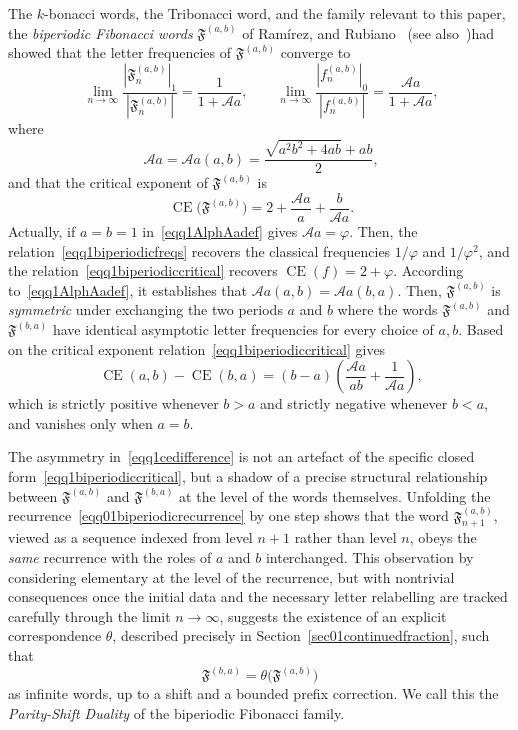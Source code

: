 \documentclass[12pt]{amsart}
\theoremstyle{plain}
\theoremstyle{definition}
\theoremstyle{remark}
\newcommand{\fphi}{\varphi}
\newcommand{\CE}{\operatorname{CE}}
\newcommand{\AlphA}{\mathcal{A}}
\newcommand{\FD}{\mathfrak{F}}
\begin{document}
The $k$-bonacci words, the Tribonacci
word, and the family relevant to this paper, the \emph{biperiodic
Fibonacci words} $\FD^{(a,b)}$ of Ram\'irez, and Rubiano~\cite{Ramirez2015} (see also~\cite{EdsonYayenie2009, MignosiPirillo1992})had showed that the letter frequencies of
$\FD^{(a,b)}$ converge to
\begin{equation}~\label{eqq1biperiodicfreqs}
  \lim_{n\to\infty}\frac{|\FD^{(a,b)}_n|_1}{|\FD^{(a,b)}_n|} = \frac{1}{1+\AlphA a},
  \qquad
  \lim_{n\to\infty}\frac{|f^{(a,b)}_n|_0}{|f^{(a,b)}_n|} = \frac{\AlphA a}{1+\AlphA a},
\end{equation}
where
\begin{equation}~\label{eqq1AlphAadef}
  \AlphA a = \AlphA a(a,b) = \frac{\sqrt{a^2b^2+4ab}+ab}{2},
\end{equation}
and that the critical exponent of $\FD^{(a,b)}$ is
\begin{equation}~\label{eqq1biperiodiccritical}
  \CE\bigl(\FD^{(a,b)}\bigr) = 2+\frac{\AlphA a}{a}+\frac{b}{\AlphA a}.
\end{equation}
Actually, if $a=b=1$ in~\eqref{eqq1AlphAadef} gives $\AlphA a=\fphi$. Then, the relation~\eqref{eqq1biperiodicfreqs} recovers the classical frequencies
$1/\fphi$ and $1/\fphi^2$, and the relation~\eqref{eqq1biperiodiccritical} recovers
$\CE(f)=2+\fphi$.  
According to~\eqref{eqq1AlphAadef}, it establishes that
$\AlphA a(a,b)=\AlphA a(b,a)$. Then,  $\FD^{(a,b)}$ is \emph{symmetric} under exchanging
the two periods $a$ and $b$ where the words $\FD^{(a,b)}$ and $\FD^{(b,a)}$ have
identical asymptotic letter frequencies for every choice of $a,b$. 
Based on the critical exponent relation~\eqref{eqq1biperiodiccritical} gives
\begin{equation}~\label{eqq1cedifference}
  \CE(a,b) - \CE(b,a)
  = (b-a)\left(\frac{\AlphA a}{ab} + \frac{1}{\AlphA a}\right),
\end{equation}
which is strictly positive whenever $b>a$ and strictly negative whenever
$b<a$, and vanishes only when $a=b$. 


The asymmetry in~\eqref{eqq1cedifference} is not an
artefact of the specific closed form~\eqref{eqq1biperiodiccritical}, but
a shadow of a precise structural relationship between $\FD^{(a,b)}$ and
$\FD^{(b,a)}$ at the level of the words themselves. Unfolding the
recurrence~\eqref{eqq01biperiodicrecurrence} by one step shows that the
word $\FD^{(a,b)}_{n+1}$, viewed as a sequence indexed from level $n+1$
rather than level $n$, obeys the \emph{same} recurrence with the roles
of $a$ and $b$ interchanged. This observation by considering elementary at the level
of the recurrence, but with nontrivial consequences once the initial
data and the necessary letter relabelling are tracked carefully through
the limit $n\to\infty$, suggests the existence of an explicit
correspondence $\theta$, described precisely in
Section~\ref{sec01continuedfraction}, such that
\[
 \FD^{(b,a)}=\theta\bigl(\FD^{(a,b)}\bigr)
\]
as infinite words, up to a shift and a bounded prefix correction. We
call this the \emph{Parity-Shift Duality} of the biperiodic Fibonacci
family. 
\end{document}
